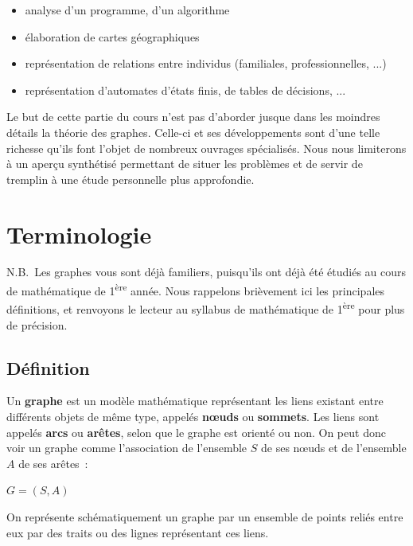 	\begin{itemize}
		\item {
			analyse d'un programme, d'un algorithme}
		\item {
			élaboration de cartes géographiques}
		\item {
			représentation de relations entre individus (familiales, professionnelles, ...)}
		\item {
			représentation d'automates d'états finis, de tables de décisions, ...}
	\end{itemize}
	
	Le but de cette partie du cours n'est pas d'aborder jusque 
	dans les moindres détails la théorie des graphes. Celle-ci et
	ses développements sont d'une telle richesse qu'ils font 
	l'objet de nombreux ouvrages spécialisés. Nous nous limiterons
	à un aperçu synthétisé permettant de situer les problèmes et de 
	servir de tremplin à une étude personnelle plus approfondie.

\section{Terminologie}

	N.B.~Les graphes vous sont déjà familiers, puisqu'ils 
	ont déjà été étudiés au cours de mathématique de
	1\textsuperscript{ère} année. Nous rappelons brièvement 
	ici les principales définitions, et renvoyons le lecteur au
	syllabus de mathématique de 1\textsuperscript{ère} 
	pour plus de précision.

	\subsection{Définition}

		Un \textbf{graphe} est un modèle mathématique représentant 
		les liens existant entre différents objets de même type,
		appelés \textbf{n{\oe}uds} ou \textbf{sommets}. Les liens 
		sont appelés \textbf{arcs} ou \textbf{arêtes}, selon que le
		graphe est orienté ou non. On peut donc voir un graphe comme 
		l'association de l'ensemble $S$ de ses n{\oe}uds et de
		l'ensemble $A$ de ses arêtes~:

		\begin{center}
			$G = (S, A)$
		\end{center}


		On représente schématiquement un graphe par un ensemble de 
		points reliés entre eux par des traits ou des lignes
		représentant ces liens.

